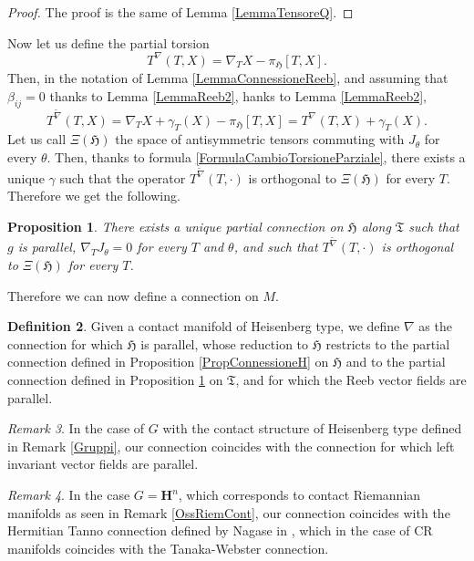\documentclass{article}
\newcommand{\g}[1]{\mathfrak{#1}}
\renewcommand{\H}{\mathbf{H}}
\newtheorem{proposizione}{Proposition}[section]
\theoremstyle{definition}
\newtheorem{definizione}[proposizione]{Definition}
\theoremstyle{remark}
\newtheorem{osservazione}[proposizione]{Remark}
\begin{document}
\begin{proof}
 The proof is the same of Lemma \ref{LemmaTensoreQ}. 
\end{proof}

Now let us define the partial torsion
$$T^{\nabla}(T,X) = \nabla_TX-\pi_{\g{H}}[T,X].$$
Then, in the notation of Lemma \ref{LemmaConnessioneReeb}, and assuming that $\beta_{ij}=0$ thanks to Lemma \ref{LemmaReeb2},
hanks to Lemma \ref{LemmaReeb2},
\begin{equation}\label{FormulaCambioTorsioneParziale}
 T^{\widetilde{\nabla}}(T,X) = \nabla_TX + \gamma_T(X) -\pi_{\g{H}}[T,X] = T^{\nabla}(T,X) + \gamma_T(X).
\end{equation}
Let us call $\Xi(\g{H})$ the space of antisymmetric tensors commuting with $J_{\theta}$ for every $\theta$.
Then, thanks to formula \eqref{FormulaCambioTorsioneParziale}, there exists a unique $\gamma$ such that the operator $T^{\widetilde{\nabla}}(T,\cdot)$ is orthogonal to $\Xi(\g{H})$ for every $T$.
Therefore we get the following.

\begin{proposizione}\label{PropConnessioneT}
	There exists a unique partial connection on $\g{H}$ along $\g{T}$ such that $g$ is parallel, $\nabla_TJ_{\theta}=0$ for every $T$ and $\theta$, and such that $T^{\widetilde{\nabla}}(T,\cdot)$ is orthogonal to $\Xi(\g{H})$ for every $T$.
\end{proposizione}

Therefore we can now define a connection on $M$.

\begin{definizione}
 Given a contact manifold of Heisenberg type, we define $\nabla$ as the connection for which $\g{H}$ is parallel, whose reduction to $\g{H}$ restricts to the partial connection defined in Proposition \ref{PropConnessioneH} on $\g{H}$ and to the partial connection defined in Proposition \ref{PropConnessioneT} on $\g{T}$, and for which the Reeb vector fields are parallel.
\end{definizione}

\begin{osservazione}
 In the case of $G$ with the contact structure of Heisenberg type defined in Remark \ref{Gruppi}, our connection coincides with the connection for which left invariant vector fields are parallel.
\end{osservazione}

\begin{osservazione}
 In the case $G=\H^n$, which corresponds to contact Riemannian manifolds as seen in Remark \ref{OssRiemCont}, our connection coincides with the Hermitian Tanno connection defined by Nagase in \cite{N}, which in the case of CR manifolds coincides with the Tanaka-Webster connection.
\end{osservazione}
\end{document}

